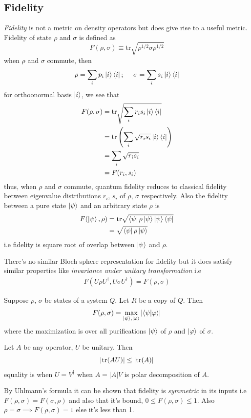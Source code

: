 \subsection{Fidelity}
\textit{Fidelity} is not a metric on  density operators but does give rise to a useful metric. Fidelity of state $\rho$ and $\sigma$ is defined as
\begin{equation}
    F(\rho, \sigma) \equiv \text{tr}\sqrt{\rho^{1/2}\sigma \rho^{1/2}}
\end{equation}
when $\rho$ and $\sigma$ commute, then
\begin{align}
    \rho = \sum_i p_i\op{i};
    \ \ \ \ 
    \sigma = \sum_i s_i\op{i}
\end{align}
for orthoonormal basis $\ket{i}$, we see that
\begin{align}
    F(\rho, \sigma) &= \text{tr}\sqrt{\sum_i r_is_i\ket{i}\bra{i}} \\
    &= \text{tr}\left( \sum_i\sqrt{r_is_i}\ket{i}\bra{i} \right) \\
    &= \sum_i \sqrt{r_is_i} \\
    &= F(r_i, s_i)
\end{align}
thus, when $\rho$ and $\sigma$ commute, quantum fidelity reduces to classical fidelity between eigenvalue distributions $r_i$, $s_i$ of $\rho$, $\sigma$ respectively. Also the fidelity between a pure state $\ket{\psi}$ and an arbitrary state $\rho$ is
\begin{align}
    F(\ket{\psi}, \rho) &= \text{tr}\sqrt{\bra{\psi}\rho\ket{\psi} \ket{\psi} \bra{\psi}} \\
    &= \sqrt{\bra{\psi}\rho\ket{\psi}}
\end{align}
i.e fidelity is square root of overlap between $\ket{\psi}$ and $\rho$.

There's no similar Bloch sphere representation for fidelity but it does satisfy similar properties like \textit{invariance under unitary transformation} i.e
\begin{align}
    F(U\rho U^\dag, U\sigma U^\dag) = F(\rho, \sigma)
\end{align}

\begin{theorem}
    Suppose $\rho$, $\sigma$ be states of a system $Q$, Let $R$ be a copy of $Q$. Then
    \begin{equation}
        F(\rho, \sigma) = \max_{\ket{\psi}, \ket{\varphi}} \left| \braket{\psi | \varphi} \right|
    \end{equation}
    where the maximization is over all purifications $\ket{\psi}$ of $\rho$ and $\ket{\varphi}$ of $\sigma$.
\end{theorem}

\begin{lemma}
    Let $A$ be any operator, $U$ be unitary. Then
    \begin{equation}
        |\text{tr}(AU)| \leq |\text{tr}(A)|
    \end{equation}
    equality is when $U=V^\dag$ when $A=|A|V$ is polar decomposition of $A$.
\end{lemma}
By Uhlmann's formula it can be shown that fidelity is \textit{symmetric} in its inputs i.e $F(\rho, \sigma) = F(\sigma, \rho)$ and also that it's bound, $0 \leq F(\rho, \sigma) \leq 1$. Also $\rho=\sigma \implies F(\rho, \sigma)=1$ else it's less than 1.